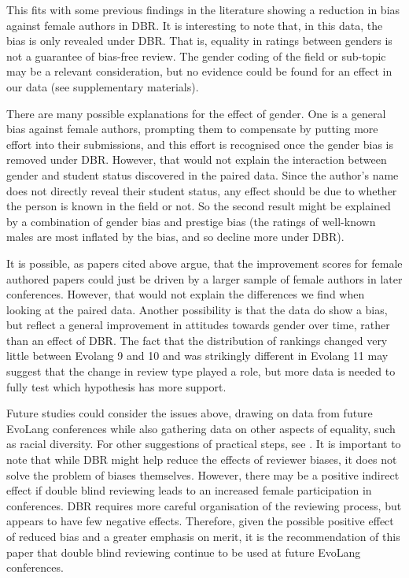 \documentclass[12pt]{article}
\begin{document}
This fits with some previous findings in the literature showing a reduction in bias against female authors in DBR.  It is interesting to note that, in this data, the bias is only revealed under DBR.  That is, equality in ratings between genders is not a guarantee of bias-free review.  The gender coding of the field or sub-topic may be a relevant consideration, but no evidence could be found for an effect in our data (see supplementary materials).  

There are many possible explanations for the effect of gender. One is a general bias against female authors, prompting them to compensate by putting more effort into their submissions, and this effort is recognised once the gender bias is removed under DBR.  However, that would not explain the interaction between gender and student status discovered in the paired data.  Since the author's name does not directly reveal their student status, any effect should be due to whether the person is known in the field or not.  So the second result might be explained by a combination of gender bias and prestige bias (the ratings of well-known males are most inflated by the bias, and so decline more under DBR).  

It is possible, as papers cited above argue, that the improvement scores for female authored papers could just be driven by a larger sample of female authors in later conferences.  However, that would not explain the differences we find when looking at the paired data.  Another possibility is that the data do show a bias, but reflect a general improvement in attitudes towards gender over time, rather than an effect of DBR.  The fact that the distribution of rankings changed very little between Evolang 9 and 10 and was strikingly different in Evolang 11 may suggest that the change in review type played a role, but more data is needed to fully test which hypothesis has more support. 

Future studies could consider the issues above, drawing on data from future EvoLang conferences while also gathering data on other aspects of equality, such as racial diversity.  For other suggestions of practical steps, see \cite{martin2014ten}.  It is important to note that while DBR might help reduce the effects of reviewer biases, it does not solve the problem of biases themselves.  However, there may be a positive indirect effect if double blind reviewing leads to an increased female participation in conferences.  DBR requires more careful organisation of the reviewing process, but appears to have few negative effects.  Therefore, given the possible positive effect of reduced bias and a greater emphasis on merit, it is the recommendation of this paper that double blind reviewing continue to be used at future EvoLang conferences.
\end{document}
